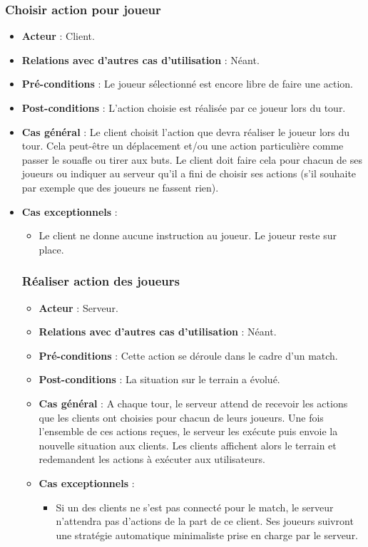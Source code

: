 \documentclass[a4paper,titlepage]{scrreprt}
\begin{document}
    \subsubsection{Choisir action pour joueur}
      \begin{itemize}
        \item \textbf{Acteur}  : Client.
        \item \textbf{Relations avec d'autres cas d'utilisation}  : Néant.
        \item \textbf{Pré-conditions} : Le joueur sélectionné est encore libre de faire une action.
        \item \textbf{Post-conditions} : L'action choisie est réalisée par ce joueur lors du tour.
        \item \textbf{Cas général} : Le client choisit l'action que devra réaliser le joueur lors du tour. Cela peut-être un déplacement et/ou une action particulière comme passer le souafle ou tirer aux buts. Le client doit faire cela pour chacun de ses joueurs ou indiquer au serveur qu’il a fini de choisir ses actions (s’il souhaite par exemple que des joueurs ne fassent rien).
        \item \textbf{Cas exceptionnels} : 
        \begin{itemize}
         \item Le client ne donne aucune instruction au joueur. Le joueur reste sur place.
      \end{itemize}
    \subsubsection{Réaliser action des joueurs}
      \begin{itemize}
        \item \textbf{Acteur}  : Serveur.
        \item \textbf{Relations avec d'autres cas d'utilisation}  : Néant.
        \item \textbf{Pré-conditions} : Cette action se déroule dans le cadre d'un match.
        \item \textbf{Post-conditions} : La situation sur le terrain a évolué.
        \item \textbf{Cas général} : A chaque tour, le serveur attend de recevoir les actions que les clients ont choisies pour chacun de leurs joueurs. Une fois l’ensemble de ces actions reçues, le serveur les exécute puis envoie la nouvelle situation aux clients. Les clients affichent alors le terrain et redemandent les actions à exécuter aux utilisateurs.
        \item \textbf{Cas exceptionnels} : 
          \begin{itemize}
            \item Si un des clients ne s’est pas connecté pour le match, le serveur n’attendra pas d’actions de la part de ce client. Ses joueurs suivront une stratégie automatique minimaliste prise en charge par le serveur.
          \end{itemize}  
      \end{itemize}

\end{itemize}
\end{document}
